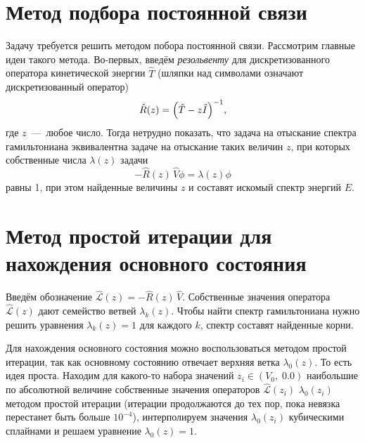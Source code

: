 \documentclass[10pt]{article}
\begin{document}
\section{Метод подбора постоянной связи}

Задачу требуется решить методом побора постоянной связи. Рассмотрим главные идеи такого метода. Во-первых, введём \emph{резольвенту} для дискретизованного оператора кинетической энергии  $\hat T$ (шляпки над символами означают дискретизованный оператор)
\begin{equation}
 \hat R(z) = \qty(\hat T - z \hat I)^{-1},
\end{equation}
где $z$~---~любое число. Тогда нетрудно показать, что задача на отыскание спектра гамильтониана эквивалентна задаче на отыскание таких величин $z$, при которых собственные числа $\lambda(z)$ задачи
\begin{equation}
 - \hat R(z)\, \hat V \phi = \lambda(z) \phi
\end{equation}
равны 1, при этом найденные величины $z$ и составят искомый спектр энергий $E$.

\section{Метод простой итерации для нахождения основного состояния}

Введём обозначение $ \hat{\mathcal{L}}(z) = - \hat R(z)\, \hat V$. Собственные значения оператора $\hat{\mathcal{L}}(z)$ дают семейство ветвей $\lambda_k(z)$. Чтобы найти спектр гамильтониана нужно решить уравнения $\lambda_k(z)=1$ для каждого $k$, спектр составят найденные корни.

Для нахождения основного состояния можно воспользоваться методом простой итерации, так как основному состоянию отвечает верхняя ветка  $\lambda_0(z)$. То есть идея проста. Находим для какого-то набора значений ${z_i} \in (V_0,\; 0.0)$ наибольшие по абсолютной величине собственные значения операторов $\hat{\mathcal{L}}(z_i)$ $\lambda_0(z_i)$ методом простой итерации (итерации продолжаются до тех пор, пока невязка перестанет быть больше $10^{-4}$), интерполируем значения $\lambda_0(z_i)$ кубическими сплайнами и решаем уравнение $\lambda_0(z)=1$.
\end{document}
